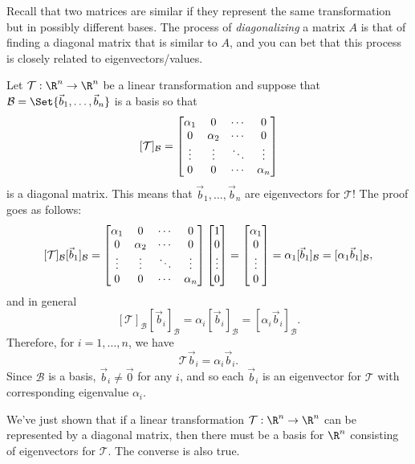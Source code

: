 Recall that two matrices are similar if they represent the same transformation but in possibly different bases.
The process of \emph{diagonalizing} a matrix $A$ is that of finding a diagonal matrix that is similar to $A$,
and you can bet that this process is closely related to eigenvectors/values.

Let $\mathcal T:\R^n\to\R^n$ be a linear transformation and suppose that $\mathcal B=\Set{\vec b_1,\ldots,\vec b_n}$
is a basis so that
\[
	[\mathcal T]_{\mathcal B} = \begin{bmatrix}\alpha_1&0&\cdots &0\\0&\alpha_2&\cdots &0\\\vdots&\vdots&\ddots&\vdots\\0&0&\cdots&\alpha_n\end{bmatrix}
\]
is a diagonal matrix. This means that $\vec b_1,\ldots,\vec b_n$ are eigenvectors for $\mathcal T$! The proof goes as follows:
\[
	[\mathcal T]_{\mathcal B}[\vec b_1]_{\mathcal B} = 
	\begin{bmatrix}\alpha_1&0&\cdots &0\\0&\alpha_2&\cdots &0\\\vdots&\vdots&\ddots&\vdots\\0&0&\cdots&\alpha_n\end{bmatrix}
	\begin{bmatrix}1\\0\\\vdots\\0\end{bmatrix} = \begin{bmatrix}\alpha_1\\0\\\vdots\\0\end{bmatrix}=\alpha_1[\vec b_1]_{\mathcal B}=[\alpha_1\vec b_1]_{\mathcal B},
\]
and in general
\[
	[\mathcal T]_{\mathcal B}[\vec b_i]_{\mathcal B} = \alpha_i[\vec b_i]_{\mathcal B}=[\alpha_i\vec b_i]_{\mathcal B}.
\]
Therefore, for $i=1,\ldots,n$, we have
\[
	\mathcal T\vec b_i=\alpha_i\vec b_i.
\]
Since $\mathcal B$ is a basis, $\vec b_i\neq \vec 0$ for any $i$, and so each $\vec b_i$ is an eigenvector for $\mathcal T$ with
corresponding eigenvalue $\alpha_i$.

We've just shown that if a linear transformation $\mathcal T:\R^n\to\R^n$ can be represented by a diagonal matrix,
then there must be a basis for $\R^n$ consisting of eigenvectors for $\mathcal T$. The converse is also true.

